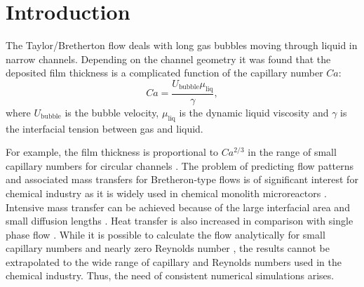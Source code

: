 \documentclass[preprint,12pt]{elsarticle}
\begin{document}
\section{Introduction}
The Taylor/Bretherton \cite{bretherton} flow deals with long gas bubbles moving through liquid in
narrow channels. Depending on the channel geometry it was found that the deposited film thickness
is a complicated function of the capillary number $Ca$:
\begin{equation}
\label{capillary:number:definition}
Ca=\frac{U_{\mathrm{bubble}} \mu_{\mathrm{liq}}}{\gamma},
\end{equation}
where $U_{\mathrm{bubble}}$ is the bubble velocity, $\mu_{\mathrm{liq}}$ is the
dynamic liquid viscosity and $\gamma$ is the interfacial tension between gas and liquid. 

For example, the film thickness
is proportional to $Ca^{2/3}$ in the range of small capillary numbers for circular channels
\cite{bretherton,heil-bretherton}. 
The problem of predicting flow patterns and associated mass transfers for Bretheron-type flows
is of significant interest for chemical industry as it is widely used in chemical monolith
microreactors \cite{kreutzer-pressure-drop}. Intensive mass transfer can be achieved because of the
large interfacial area and small diffusion lengths \cite{cerro-bubble-train}. Heat transfer is
also increased in comparison with single phase flow \cite{fukugata-levelset}. While it
is possible to calculate the flow analytically for small capillary numbers and nearly zero Reynolds
number \cite{bretherton}, the
results cannot be extrapolated to the wide range of capillary and Reynolds numbers used in the
chemical industry.  Thus, the need of consistent numerical simulations arises.
\end{document}
